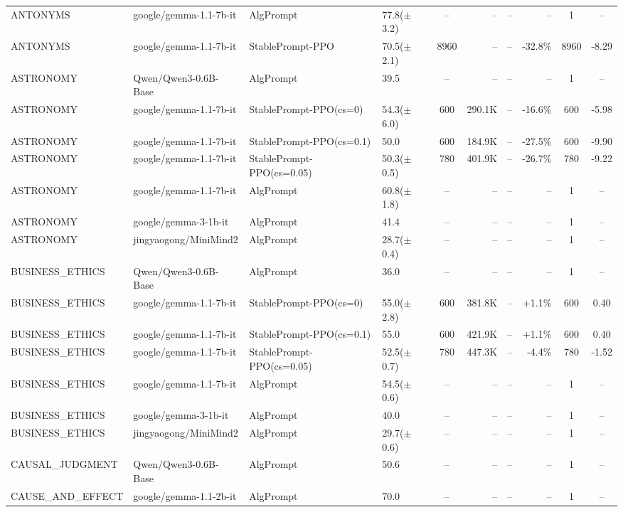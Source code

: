 {\begin{longtable}{@{}p{5.5cm}p{4.5cm}p{2.5cm}lcrrrcc@{}}
\midrule
ANTONYMS & google/gemma-1.1-7b-it & AlgPrompt & 77.8($\pm$3.2) & -- & -- & -- & -- & 1 & -- \\
ANTONYMS & google/gemma-1.1-7b-it & StablePrompt-PPO & 70.5($\pm$2.1) & 8960 & -- & -- & -32.8\% & 8960 & -8.29 \\
\midrule
ASTRONOMY & Qwen/Qwen3-0.6B-Base & AlgPrompt & 39.5 & -- & -- & -- & -- & 1 & -- \\
\midrule
ASTRONOMY & google/gemma-1.1-7b-it & StablePrompt-PPO(cs=0) & 54.3($\pm$6.0) & 600 & 290.1K & -- & -16.6\% & 600 & -5.98 \\
ASTRONOMY & google/gemma-1.1-7b-it & StablePrompt-PPO(cs=0.1) & 50.0 & 600 & 184.9K & -- & -27.5\% & 600 & -9.90 \\
ASTRONOMY & google/gemma-1.1-7b-it & StablePrompt-PPO(cs=0.05) & 50.3($\pm$0.5) & 780 & 401.9K & -- & -26.7\% & 780 & -9.22 \\
ASTRONOMY & google/gemma-1.1-7b-it & AlgPrompt & 60.8($\pm$1.8) & -- & -- & -- & -- & 1 & -- \\
\midrule
ASTRONOMY & google/gemma-3-1b-it & AlgPrompt & 41.4 & -- & -- & -- & -- & 1 & -- \\
\midrule
ASTRONOMY & jingyaogong/MiniMind2 & AlgPrompt & 28.7($\pm$0.4) & -- & -- & -- & -- & 1 & -- \\
\midrule
BUSINESS\_ETHICS & Qwen/Qwen3-0.6B-Base & AlgPrompt & 36.0 & -- & -- & -- & -- & 1 & -- \\
\midrule
BUSINESS\_ETHICS & google/gemma-1.1-7b-it & StablePrompt-PPO(cs=0) & 55.0($\pm$2.8) & 600 & 381.8K & -- & +1.1\% & 600 & 0.40 \\
BUSINESS\_ETHICS & google/gemma-1.1-7b-it & StablePrompt-PPO(cs=0.1) & 55.0 & 600 & 421.9K & -- & +1.1\% & 600 & 0.40 \\
BUSINESS\_ETHICS & google/gemma-1.1-7b-it & StablePrompt-PPO(cs=0.05) & 52.5($\pm$0.7) & 780 & 447.3K & -- & -4.4\% & 780 & -1.52 \\
BUSINESS\_ETHICS & google/gemma-1.1-7b-it & AlgPrompt & 54.5($\pm$0.6) & -- & -- & -- & -- & 1 & -- \\
\midrule
BUSINESS\_ETHICS & google/gemma-3-1b-it & AlgPrompt & 40.0 & -- & -- & -- & -- & 1 & -- \\
\midrule
BUSINESS\_ETHICS & jingyaogong/MiniMind2 & AlgPrompt & 29.7($\pm$0.6) & -- & -- & -- & -- & 1 & -- \\
\midrule
CAUSAL\_JUDGMENT & Qwen/Qwen3-0.6B-Base & AlgPrompt & 50.6 & -- & -- & -- & -- & 1 & -- \\
\midrule
CAUSE\_AND\_EFFECT & google/gemma-1.1-2b-it & AlgPrompt & 70.0 & -- & -- & -- & -- & 1 & -- \\

\end{longtable}}
